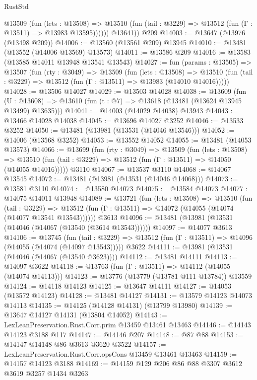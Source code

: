 \begin{lexlean}{RustStd}
\begin{coremodule}
{\begin{coremodule}
{{{{{{{{{{{{{{{{{{{{{{{{{{{{{{{{{{{{{            @13509
              (fun (lets : @13508) =>
              @13510 (fun (tail : @3229) => @13512 (fun (Γ : @13511) => @13983 @13595))))))
        @13641))
    @209
@14003 := @13647 (@13976 (@13498 @209))
@14006 := @13560 (@13561 @209) @13945
@14010 := @13481 (@13552 (@14006 @13569) @13573)
@14011 := @13586 @209
@14016 := @13583 (@13585 @14011 @13948 @13541 @13543)
@14027 := fun (params : @13505) =>
  @13507
    (fun (rty : @3049) =>
    @13509
      (fun (lets : @13508) =>
      @13510 (fun (tail : @3229) => @13512 (fun (Γ : @13511) => @13983 (@14010 @14016)))))
@14028 := @13506 @14027
@14029 := @13503 @14028
@14038 := @13609
    (fun (U : @13608) => @13610 (fun (t : @7) => @13618 (@13481 (@13624 @13945 @13499) @13635)))
@14041 := @14003 (@14029 @14038) @13943
@14043 := @13466 @14028 @14038
@14045 := @13696 @14027 @3252
@14046 := @13533 @3252
@14050 := @13481 (@13981 (@13531 (@14046 @13546)))
@14052 := @14006 (@13568 @3252)
@14053 := @13552 @14052
@14055 := @13481 (@14053 @13573)
@14066 := @13699
    (fun (rty : @3049) =>
    @13509
      (fun (lets : @13508) =>
      @13510 (fun (tail : @3229) => @13512 (fun (Γ : @13511) => @14050 (@14055 @14016)))))
    @3110
@14067 := @13537 @3110
@14068 := @14067 @13545
@14072 := @13481 (@13981 (@13531 (@14046 @14068)))
@14073 := @13581 @3110
@14074 := @13580 @14073
@14075 := @13584 @14073
@14077 := @14075 @14011 @13948
@14089 := @13721
    (fun (lets : @13508) =>
    @13510
      (fun (tail : @3229) =>
      @13512 (fun (Γ : @13511) => @14072 (@14055 (@14074 (@14077 @13541 @13543))))))
    @3613
@14096 := @13481 (@13981 (@13531 (@14046 (@14067 (@13540 (@3614 @13543))))))
@14097 := @14077 @3613
@14106 := @13745
    (fun (tail : @3229) => @13512 (fun (Γ : @13511) => @14096 (@14055 (@14074 (@14097 @13543)))))
    @3622
@14111 := @13981 (@13531 (@14046 (@14067 (@13540 @3623))))
@14112 := @13481 @14111
@14113 := @14097 @3622
@14118 := @13763 (fun (Γ : @13511) => @14112 (@14055 (@14074 @14113)))
@14123 := @13776 (@13779 (@13781 @111 @13784)) @13559
@14124 := @14118 @14123
@14125 := @13647 @14111
@14127 := @14053 (@13572 @14123)
@14128 := @13481 @14127
@14131 := @13579 @14123 @14073 @14113
@14135 := @14125 (@14128 @14131) (@13799 @13980)
@14139 := @13647 @14127 @14131 (@13804 @14052)
@14143 := LexLeanPreservation.Rust.Corr.prim @13459 @13461 @13463
@14146 := @14143 @14123 @3188 @117
@14147 := @14146 @207
@14148 := @87 @88
@14153 := @14147 @14148 @86 @3613 @3620 @3522
@14157 := LexLeanPreservation.Rust.Corr.opsCons @13459 @13461 @13463
@14159 := @14157 @14123 @3188
@14169 := @14159 @129 @206 @86 @88 @3307 @3612 @3619 @3257 @1434 @3263
}}}}}}}}}}}}}}}}}}}}}}}}}}}}}}}}}}}}}
\end{coremodule}}
\end{coremodule}
\end{lexlean}

